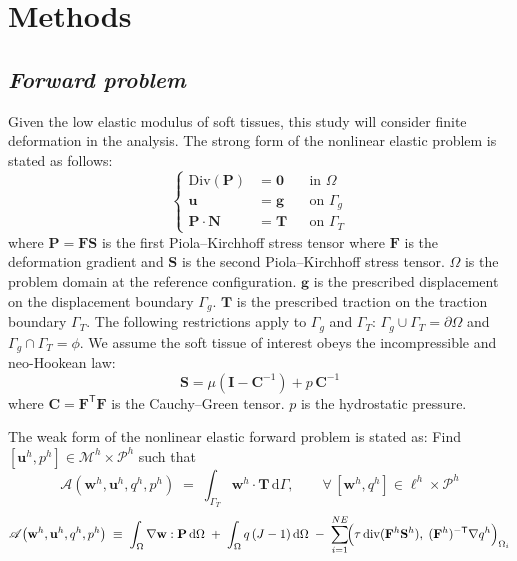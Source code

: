 \documentclass[11pt]{article}
\begin{document}
\section*{Methods}

\subsection*{\textit{Forward problem}}

\noindent
Given the low elastic modulus of soft tissues, this study will
consider finite deformation in the analysis. The strong form of the
nonlinear elastic problem is stated as follows:
\begin{equation}
\left\{
\begin{aligned}
\mathrm{Div}(\mathbf{P}) &= \mathbf{0} && \text{in } \Omega \\
\mathbf{u}               &= \mathbf{g} && \text{on } \Gamma_g \\
\mathbf{P}\cdot\mathbf{N} &= \mathbf{T} && \text{on } \Gamma_T
\end{aligned}
\right.
\end{equation}
where $\mathbf{P} = \mathbf{F}\mathbf{S}$ is the first
Piola--Kirchhoff stress tensor where $\mathbf{F}$ is the deformation
gradient and $\mathbf{S}$ is the second Piola--Kirchhoff stress
tensor. $\Omega$ is the problem domain at the reference
configuration. $\mathbf{g}$ is the prescribed displacement on the
displacement boundary $\Gamma_g$. $\mathbf{T}$ is the prescribed
traction on the traction boundary $\Gamma_T$. The following
restrictions apply to $\Gamma_g$ and $\Gamma_T$: $\Gamma_g \cup
\Gamma_T = \partial\Omega$ and $\Gamma_g \cap \Gamma_T = \phi$. We
assume the soft tissue of interest obeys the incompressible and
neo-Hookean law:
\begin{equation}
\mathbf{S} = \mu\!\left(\mathbf{I} - \mathbf{C}^{-1}\right)
             + p\,\mathbf{C}^{-1}
\end{equation}
where $\mathbf{C} = \mathbf{F}^{\mathsf{T}}\mathbf{F}$ is the
Cauchy--Green tensor. $p$ is the hydrostatic pressure.

The weak form of the nonlinear elastic forward problem is stated as:
Find $[\mathbf{u}^h, p^h] \in \mathscr{M}^h \times \mathscr{P}^h$
such that
\begin{equation}
\mathscr{A}\!\left(\mathbf{w}^h,\mathbf{u}^h,q^h,p^h\right)
\;=\;
\int_{\Gamma_T}\! \mathbf{w}^h\!\cdot\mathbf{T}\,\mathrm{d}\Gamma,
\qquad
\forall\,[\mathbf{w}^h, q^h] \in \ell^h \times \mathscr{P}^h
\end{equation}
\begin{equation}
\mathscr{A}\!\left(\mathbf{w}^h,\mathbf{u}^h,q^h,p^h\right)
\;\equiv\;
\int_\Omega \nabla\mathbf{w}:\mathbf{P}\,\mathrm{d}\Omega
\;+\;
\int_\Omega q\,(J-1)\,\mathrm{d}\Omega
\;-\;
\sum_{i=1}^{NE}\!
 \Bigl(\tau\,\mathrm{div}(\mathbf{F}^h\mathbf{S}^h),\;
       (\mathbf{F}^h)^{-\mathsf{T}}\nabla q^h\Bigr)_{\Omega_i}
\end{equation}
\end{document}
